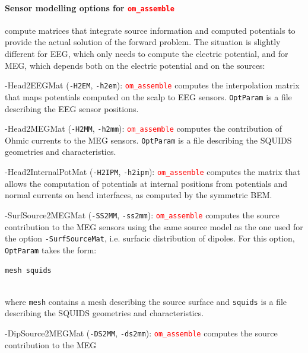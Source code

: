 \documentclass[10pt,journal]{book}
\newcommand{\commandName}[1]{\textcolor{red}{\tt #1}}
\newcommand{\optionName}[1]{\textcolor{OliveGreen}{\tt #1}}
\newcommand{\Param}[1]{{\tt #1}}
\newcommand*\OptionsLabel[1]{\optionName{#1}}
\newenvironment{Options}{
    \begin{list}{}{
        \let\makelabel\OptionsLabel\setlength\labelwidth{30pt}%
        \setlength\leftmargin{\labelwidth+\labelsep}}}
    {\end{list}}
\begin{document}
        \paragraph*{Sensor modelling options for \commandName{om\_assemble}} compute matrices that integrate source information and computed potentials to
            provide the actual solution of the forward problem. The situation is slightly different for EEG, which only needs to compute the electric potential,
            and for MEG, which depends both on the electric potential and on the sources:
            \begin{Options}
                \item[-Head2EEGMat] (\optionName{-H2EM}, \optionName{-h2em}): \commandName{om\_assemble} computes the interpolation matrix that maps potentials
                        computed on the scalp to EEG sensors. \optionName{OptParam} is a file describing the EEG sensor positions.
                \item[-Head2MEGMat] (\optionName{-H2MM}, \optionName{-h2mm}): \commandName{om\_assemble} computes the contribution of Ohmic currents to the MEG
                        sensors. \optionName{OptParam} is a file describing the SQUIDS geometries and characteristics.
                \item[-Head2InternalPotMat] (\optionName{-H2IPM}, \optionName{-h2ipm}): \commandName{om\_assemble} computes the matrix that allows
                        the computation of potentials at internal positions from potentials and normal currents on head interfaces, as computed by the symmetric BEM.
                \item[-SurfSource2MEGMat] (\optionName{-SS2MM}, \optionName{-ss2mm}): \commandName{om\_assemble} computes the source contribution to the MEG
                        sensors using the same source model as the one used for the option \optionName{-SurfSourceMat}, i.e. surfacic distribution of dipoles.
                        For this option, \optionName{OptParam} takes the form:\\
                        \centerline{\Param{mesh squids}}\\
                        where \Param{mesh} contains a mesh describing the source surface and \Param{squids} is a file describing the SQUIDS geometries
                        and characteristics.
                \item[-DipSource2MEGMat] (\optionName{-DS2MM}, \optionName{-ds2mm}): \commandName{om\_assemble} computes the source contribution to the MEG

\end{Options}
\end{document}
